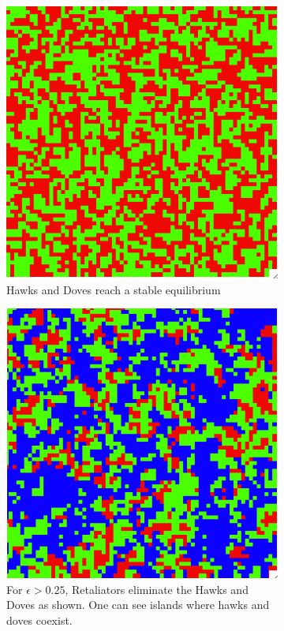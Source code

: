 \documentclass[12pt]{amsart}
\begin{document}
\begin{figure}[ht]
	\begin{subfigure}[b]{0.3\textwidth}
		\includegraphics[width = \textwidth]{Diagrams/HDR/HD_equilibrium}
		\caption{Hawks and Doves reach a stable equilibrium}
		\label{fig:HD_equilibrium}
	\end{subfigure}

	\begin{subfigure}[b]{0.3\textwidth}
		\includegraphics[width = \textwidth]{Diagrams/HDR/R_2}
		\caption{For $\epsilon > 0.25$, Retaliators eliminate the Hawks and Doves as shown. 			One can see islands where hawks and doves coexist.}
		\label{fig:retaliators_winning_2}
	\end{subfigure}

	\caption{}\label{fig:lakfhdsalgkh}
\end{figure}
\end{document}
